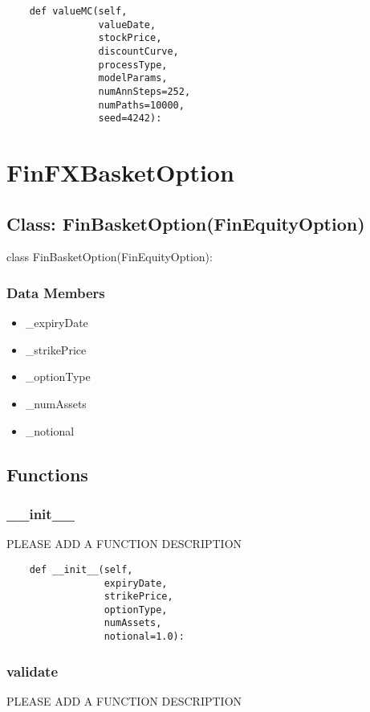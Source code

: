 \documentclass[twoside,11pt]{book}
\begin{document}
\begin{lstlisting}
    def valueMC(self,
                valueDate,
                stockPrice,
                discountCurve,
                processType,
                modelParams,
                numAnnSteps=252,
                numPaths=10000,
                seed=4242):
\end{lstlisting}

\newpage
\section{FinFXBasketOption}

\subsection*{Class: FinBasketOption(FinEquityOption)}
class FinBasketOption(FinEquityOption): 

\subsubsection*{Data Members}
\begin{itemize}
\item{\_expiryDate}
\item{\_strikePrice}
\item{\_optionType}
\item{\_numAssets}
\item{\_notional}
\end{itemize}

\subsection*{Functions}

\subsubsection*{{\bf \_\_init\_\_}}
PLEASE ADD A FUNCTION DESCRIPTION

\begin{lstlisting}
    def __init__(self,
                 expiryDate,
                 strikePrice,
                 optionType,
                 numAssets,
                 notional=1.0):
\end{lstlisting}

\subsubsection*{{\bf validate}}
PLEASE ADD A FUNCTION DESCRIPTION
\end{document}
